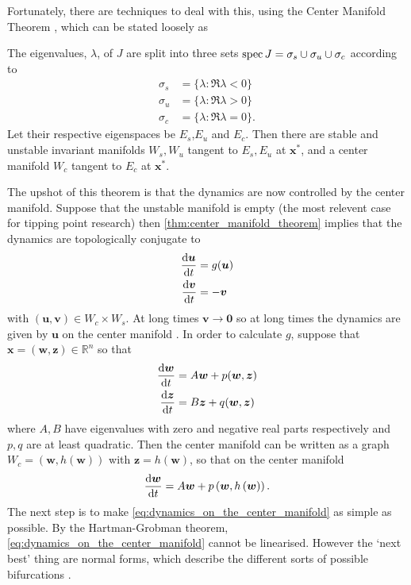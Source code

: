 Fortunately, there are techniques to deal with this, using the Center Manifold Theorem \parencite{Morris1977}, which can be stated loosely as
\begin{theorem}
  \label{thm:center_manifold_theorem}
  The eigenvalues, $\lambda$, of $J$ are split into three sets $\operatorname{spec} J = \sigma_s \cup \sigma_u \cup \sigma_c$ according to
  \begin{align*}
    \sigma_s &= \{\lambda : \Re \lambda < 0\} \\
    \sigma_u &= \{\lambda : \Re \lambda > 0\} \\
    \sigma_c &= \{\lambda : \Re \lambda = 0\}.
  \end{align*}
  Let their respective eigenspaces be $E_s$,$E_u$ and $E_c$. Then there are stable and unstable invariant manifolds $W_s,W_u$ tangent to $E_s,E_u$ at $\bm{x}^{*}$,
  and a center manifold $W_c$ tangent to $E_c$ at $\bm{x}^*$.
\end{theorem}
The upshot of this theorem is that the dynamics are now controlled by the center manifold. Suppose that the unstable manifold is empty (the most relevent case for tipping point research)
then \cref{thm:center_manifold_theorem} implies that the dynamics are topologically conjugate to
\begin{subequations}
  \label{eq:center_manifold_topological_equivalence}
  \begin{align}
  \dv{\bm{u}}{t} &= g(\bm{u}) \\
  \dv{\bm{v}}{t} &= -\bm{v}
  \end{align}
\end{subequations}
with $(\bm{u},\bm{v}) \in W_c \times W_s$. At long times $\bm{v} \rightarrow \bm{0}$ so at long times the dynamics are given by $\bm{u}$ on the center manifold
\parencite{guckenheimer2013}. In order to calculate $g$, suppose that
$\bm{x} = (\bm{w},\bm{z}) \in \mathbb{R}^n$ so that
\begin{subequations}
  \label{eq:block_diagonal}
  \begin{align}
    \dv{\bm{w}}{t} &= A\bm{w} + p(\bm{w},\bm{z}) \\
    \dv{\bm{z}}{t} &= B\bm{z} + q(\bm{w},\bm{z})
  \end{align}
\end{subequations}
where $A,B$ have eigenvalues with zero and negative real parts respectively and $p,q$ are at least quadratic. Then the center manifold can be written as a graph $W_c = (\bm{w},h(\bm{w}))$
with $\bm{z} = h(\bm{w})$, so that on the center manifold
\begin{equation}
  \label{eq:dynamics_on_the_center_manifold}
  \dv{\bm{w}}{t} = A\bm{w} + p\left(\bm{w},h\left(\bm{w}\right)\right).
\end{equation}
The next step is to make \cref{eq:dynamics_on_the_center_manifold} as simple as possible. By the Hartman-Grobman theorem, \cref{eq:dynamics_on_the_center_manifold}
cannot be linearised. However the `next best' thing are normal forms, which describe the different sorts of possible bifurcations \parencite{Dijkstra2011}.

